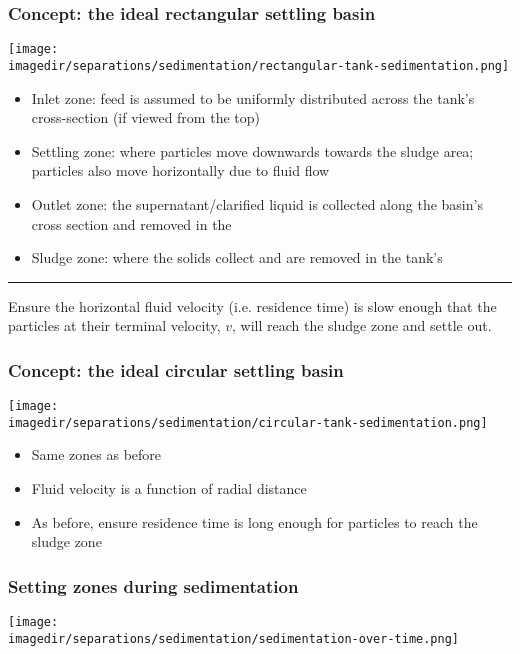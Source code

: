 \begin{frame}\frametitle{Concept: the ideal rectangular settling basin}
	
	\begin{center}
		\texttt{[image: \\imagedir/separations/sedimentation/rectangular-tank-sedimentation.png]}
	\end{center}
	{\scriptsize
	\begin{itemize}
		\item	Inlet zone: feed is assumed to be uniformly distributed across the tank's cross-section (if viewed from the top)
		\item	Settling zone: where particles move downwards towards the sludge area; particles also move horizontally due to fluid flow
		\item	Outlet zone: the supernatant/clarified liquid is collected along the basin's cross section and removed in the {}
		\item	Sludge zone: where the solids collect and are removed in the tank's {}
	\end{itemize}
	}
	\hrule
	Ensure the horizontal fluid velocity (i.e. residence time) is slow enough that the particles at their terminal velocity, $v$, will reach the sludge zone and settle out.
\end{frame}

\begin{frame}\frametitle{Concept: the ideal circular settling basin}
	
	\begin{center}
		\texttt{[image: \\imagedir/separations/sedimentation/circular-tank-sedimentation.png]}
	\end{center}
	\begin{itemize}
		\item	Same zones as before
		\item	Fluid velocity is a function of radial distance
		\item	As before, ensure residence time is long enough for particles to reach the sludge zone
	\end{itemize}
\end{frame}

\begin{frame}\frametitle{Setting zones during sedimentation}
	\begin{center}
		\texttt{[image: \\imagedir/separations/sedimentation/sedimentation-over-time.png]}
	\end{center}
\end{frame}

